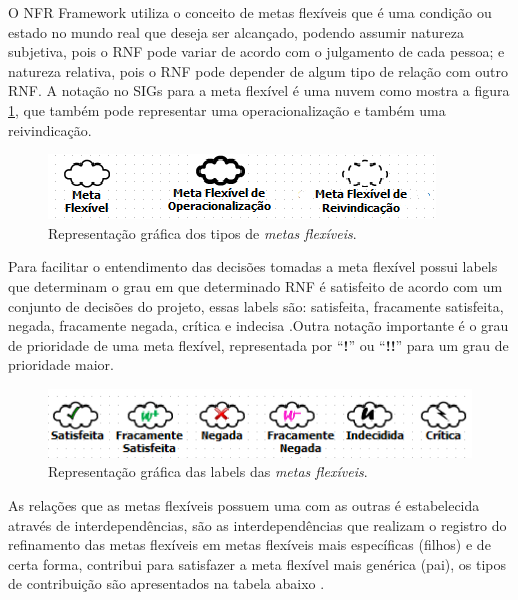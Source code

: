 O NFR Framework utiliza o conceito de metas flexíveis que é uma condição ou estado no mundo real que deseja ser alcançado, podendo assumir natureza subjetiva, pois o RNF pode variar de acordo com o julgamento de cada pessoa; e natureza relativa, pois o RNF pode depender de algum tipo de relação com outro RNF.  A notação no SIGs para a meta flexível é uma nuvem como mostra a figura \ref{fig01}, que também pode representar uma operacionalização e também uma reivindicação.

\begin{figure}[h]
	\centering
	\includegraphics[keepaspectratio=true,scale=0.9]{figuras/tiposDeSoftgoals.png}
	\caption{Representação gráfica dos tipos de \textit{metas flexíveis}.}
	\label{fig01}
\end{figure} 

Para facilitar o entendimento das decisões tomadas a meta flexível possui labels que determinam o grau em que determinado RNF é satisfeito de acordo com um conjunto de decisões do projeto, essas labels são: satisfeita, fracamente satisfeita,  negada, fracamente negada, crítica e indecisa \cite{chung2012non}.Outra notação importante é o grau de prioridade de uma meta flexível, representada por “\textbf{!}” ou “\textbf{!!}” para um grau de prioridade maior.

\begin{figure}[h]
	\centering
	\includegraphics[keepaspectratio=true,scale=0.9]{figuras/labelsSoftgoals.png}
	\caption{Representação gráfica das labels das \textit{metas flexíveis}.}
	\label{fig02}
\end{figure} 

As relações que as metas flexíveis possuem uma com as outras é estabelecida através de interdependências, são as interdependências que realizam o registro do refinamento das metas flexíveis em metas flexíveis mais específicas (filhos) e de certa forma, contribui para satisfazer a meta flexível mais genérica (pai), os tipos de contribuição são apresentados na tabela abaixo \cite{chung2012non}.

